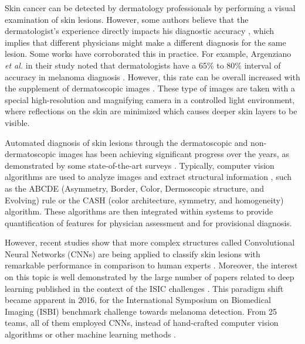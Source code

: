     Skin cancer can be detected by dermatology professionals by performing a visual examination of skin lesions. However, some authors believe that the dermatologist's experience directly impacts his diagnostic accuracy \cite{Haenssle2018}, which implies that different physicians might make a different diagnosis for the same lesion. Some works have corroborated this in practice. For example, Argenziano \textit{et al.} in their study noted that dermatologists have a 65\% to 80\% interval of accuracy in melanoma diagnosis \cite{Argenziano2001}. However, this rate can be overall increased with the supplement of dermatoscopic images \cite{Kittler2002}. These type of images are taken with a special high-resolution and magnifying camera in a controlled light environment, where reflections on the skin are minimized which causes deeper skin layers to be visible. \par

    Automated diagnosis of skin lesions through the dermatoscopic and non-dermatoscopic images has been achieving significant progress over the years, as demonstrated by some state-of-the-art surveys \cite{Okur2018}\cite{Pathan2018}\cite{Mishra2016}. Typically, computer vision algorithms are used to analyze images and extract structural information \cite{Henning2007}, such as the ABCDE (Asymmetry, Border, Color, Dermoscopic structure, and Evolving) rule \cite{Nachbar1994} or the CASH (color architecture, symmetry, and homogeneity) algorithm. These algorithms are then integrated within systems to provide quantification of features for physician assessment and for provisional diagnosis. \par
    
    However, recent studies show that more complex structures called Convolutional Neural Networks (\ac{CNN}s) are being applied to classify skin lesions with remarkable performance in comparison to human experts \cite{Esteva2017}\cite{Haenssle2018}\cite{Tschandl2019}. Moreover, the interest on this topic is well demonstrated by the large number of papers related to deep learning published in the context of the \ac{ISIC} challenges \cite{humanvsisic2018}. This paradigm shift became apparent in 2016, for the International Symposium on Biomedical Imaging (ISBI) benchmark challenge towards melanoma detection. From 25 teams, all of them employed \ac{CNN}s, instead of hand-crafted computer vision algorithms or other machine learning methods \cite{Brinker2018}. 
    
